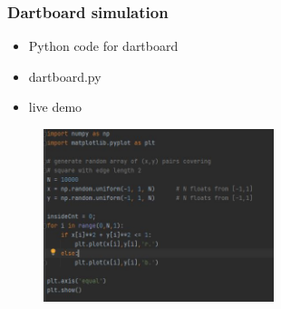 \documentclass[english,14pt]{beamer}
\begin{document}
\begin{frame}[fragile]

\frametitle{Dartboard simulation}

\begin{itemize}
	\item Python code for dartboard
	\item dartboard.py
	\item live demo
\end{itemize}

\begin{figure}[ht]
	\centering
	\includegraphics[width=0.6\textwidth]{figures/dartboard}
\end{figure}

\end{frame}

\end{document}

